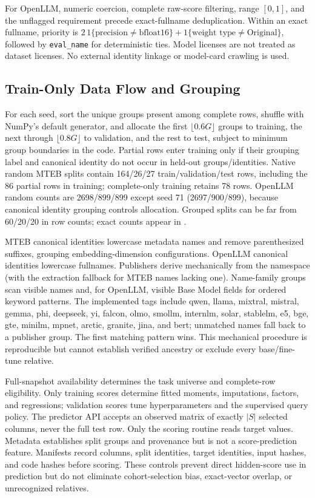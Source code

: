 \documentclass{article}
\newcommand{\artifact}[1]{\path{#1}}
\begin{document}
For OpenLLM, numeric coercion, complete raw-score filtering, range $[0,1]$, and the unflagged requirement precede exact-fullname deduplication. Within an exact fullname, priority is $2\,1\{\text{precision}\ne\text{bfloat16}\}+1\{\text{weight type}\ne\text{Original}\}$, followed by \texttt{eval\_name} for deterministic ties. Model licenses are not treated as dataset licenses. No external identity linkage or model-card crawling is used.

\subsection{Train-Only Data Flow and Grouping}
For each seed, sort the unique groups present among complete rows, shuffle with NumPy's default generator, and allocate the first $\lfloor0.6G\rfloor$ groups to training, the next through $\lfloor0.8G\rfloor$ to validation, and the rest to test, subject to minimum group boundaries in the code. Partial rows enter training only if their grouping label and canonical identity do not occur in held-out groups/identities. Native random MTEB splits contain 164/26/27 train/validation/test rows, including the 86 partial rows in training; complete-only training retains 78 rows. OpenLLM random counts are 2698/899/899 except seed 71 (2697/900/899), because canonical identity grouping controls allocation. Grouped splits can be far from 60/20/20 in row counts; exact counts appear in \artifact{artifacts/analysis/split_audit.csv}.

MTEB canonical identities lowercase metadata names and remove parenthesized suffixes, grouping embedding-dimension configurations. OpenLLM canonical identities lowercase fullnames. Publishers derive mechanically from the namespace (with the extraction fallback for MTEB names lacking one). Name-family groups scan visible names and, for OpenLLM, visible Base Model fields for ordered keyword patterns. The implemented tags include qwen, llama, mixtral, mistral, gemma, phi, deepseek, yi, falcon, olmo, smollm, internlm, solar, stablelm, e5, bge, gte, minilm, mpnet, arctic, granite, jina, and bert; unmatched names fall back to a publisher group. The first matching pattern wins. This mechanical procedure is reproducible but cannot establish verified ancestry or exclude every base/fine-tune relative.

Full-snapshot availability determines the task universe and complete-row eligibility. Only training scores determine fitted moments, imputations, factors, and regressions; validation scores tune hyperparameters and the supervised query policy. The predictor API accepts an observed matrix of exactly $|S|$ selected columns, never the full test row. Only the scoring routine reads target values. Metadata establishes split groups and provenance but is not a score-prediction feature. Manifests record columns, split identities, target identities, input hashes, and code hashes before scoring. These controls prevent direct hidden-score use in prediction but do not eliminate cohort-selection bias, exact-vector overlap, or unrecognized relatives.
\end{document}
